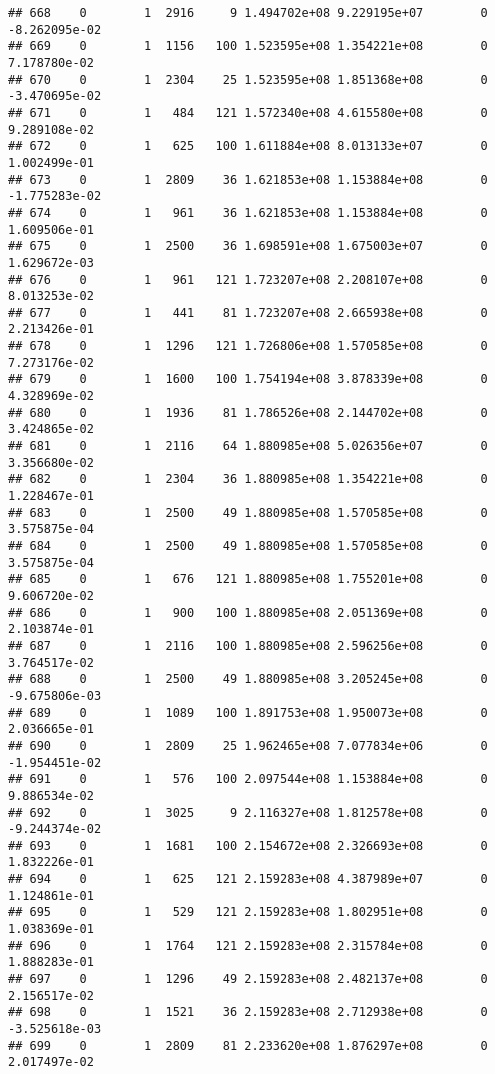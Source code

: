 \documentclass[
]{article}
\begin{document}
\begin{enumerate}
\begin{verbatim}
## 668    0        1  2916     9 1.494702e+08 9.229195e+07        0 -8.262095e-02
## 669    0        1  1156   100 1.523595e+08 1.354221e+08        0  7.178780e-02
## 670    0        1  2304    25 1.523595e+08 1.851368e+08        0 -3.470695e-02
## 671    0        1   484   121 1.572340e+08 4.615580e+08        0  9.289108e-02
## 672    0        1   625   100 1.611884e+08 8.013133e+07        0  1.002499e-01
## 673    0        1  2809    36 1.621853e+08 1.153884e+08        0 -1.775283e-02
## 674    0        1   961    36 1.621853e+08 1.153884e+08        0  1.609506e-01
## 675    0        1  2500    36 1.698591e+08 1.675003e+07        0  1.629672e-03
## 676    0        1   961   121 1.723207e+08 2.208107e+08        0  8.013253e-02
## 677    0        1   441    81 1.723207e+08 2.665938e+08        0  2.213426e-01
## 678    0        1  1296   121 1.726806e+08 1.570585e+08        0  7.273176e-02
## 679    0        1  1600   100 1.754194e+08 3.878339e+08        0  4.328969e-02
## 680    0        1  1936    81 1.786526e+08 2.144702e+08        0  3.424865e-02
## 681    0        1  2116    64 1.880985e+08 5.026356e+07        0  3.356680e-02
## 682    0        1  2304    36 1.880985e+08 1.354221e+08        0  1.228467e-01
## 683    0        1  2500    49 1.880985e+08 1.570585e+08        0  3.575875e-04
## 684    0        1  2500    49 1.880985e+08 1.570585e+08        0  3.575875e-04
## 685    0        1   676   121 1.880985e+08 1.755201e+08        0  9.606720e-02
## 686    0        1   900   100 1.880985e+08 2.051369e+08        0  2.103874e-01
## 687    0        1  2116   100 1.880985e+08 2.596256e+08        0  3.764517e-02
## 688    0        1  2500    49 1.880985e+08 3.205245e+08        0 -9.675806e-03
## 689    0        1  1089   100 1.891753e+08 1.950073e+08        0  2.036665e-01
## 690    0        1  2809    25 1.962465e+08 7.077834e+06        0 -1.954451e-02
## 691    0        1   576   100 2.097544e+08 1.153884e+08        0  9.886534e-02
## 692    0        1  3025     9 2.116327e+08 1.812578e+08        0 -9.244374e-02
## 693    0        1  1681   100 2.154672e+08 2.326693e+08        0  1.832226e-01
## 694    0        1   625   121 2.159283e+08 4.387989e+07        0  1.124861e-01
## 695    0        1   529   121 2.159283e+08 1.802951e+08        0  1.038369e-01
## 696    0        1  1764   121 2.159283e+08 2.315784e+08        0  1.888283e-01
## 697    0        1  1296    49 2.159283e+08 2.482137e+08        0  2.156517e-02
## 698    0        1  1521    36 2.159283e+08 2.712938e+08        0 -3.525618e-03
## 699    0        1  2809    81 2.233620e+08 1.876297e+08        0  2.017497e-02

\end{verbatim}
\end{enumerate}
\end{document}
